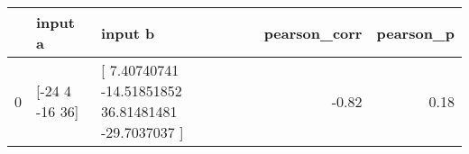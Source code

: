 \begin{tabular}{lllrr}
\toprule
 & input a & input b & pearson\_corr & pearson\_p \\
\midrule
0 & [-24   4 -16  36] & [  7.40740741 -14.51851852  36.81481481 -29.7037037 ] & -0.82 & 0.18 \\
\bottomrule
\end{tabular}
